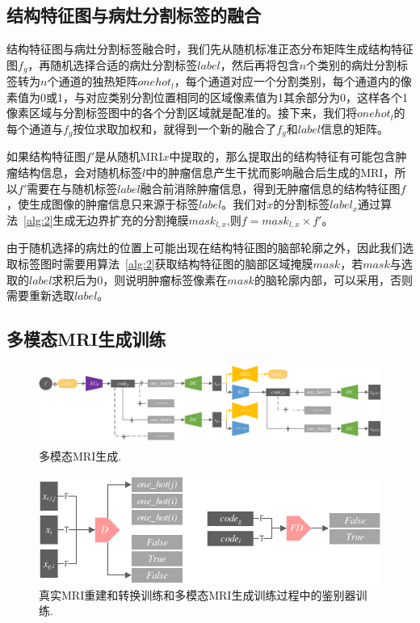 \documentclass[letterpaper]{article} %
\begin{document}
\subsection{结构特征图与病灶分割标签的融合}

结构特征图与病灶分割标签融合时，我们先从随机标准正态分布矩阵生成结构特征图$f_g$，再随机选择合适的病灶分割标签$label$，然后再将包含$n$个类别的病灶分割标签转为$n$个通道的独热矩阵$onehot_l$，每个通道对应一个分割类别，每个通道内的像素值为0或1，与对应类别分割位置相同的区域像素值为1其余部分为0，这样各个1像素区域与分割标签图中的各个分割区域就是配准的。接下来，我们将$onehot_l$的每个通道与$f_g$按位求取加权和，就得到一个新的融合了$f_g$和$label$信息的矩阵。

如果结构特征图$f'$是从随机MRI$x$中提取的，那么提取出的结构特征有可能包含肿瘤结构信息，会对随机标签$l$中的肿瘤信息产生干扰而影响融合后生成的MRI，所以$f'$需要在与随机标签$label$融合前消除肿瘤信息，得到无肿瘤信息的结构特征图$f$，使生成图像的肿瘤信息只来源于标签$label$。我们对$x$的分割标签$label_x$通过算法~\ref{alg:2}生成无边界扩充的分割掩膜$mask_{l,x}$,则$f=mask_{l,x}\times f'$。

由于随机选择的病灶的位置上可能出现在结构特征图的脑部轮廓之外，因此我们选取标签图时需要用算法~\ref{alg:2}获取结构特征图的脑部区域掩膜$mask$，若$mask$与选取的$label$求积后为0，则说明肿瘤标签像素在$mask$的脑轮廓内部，可以采用，否则需要重新选取$label$。

\subsection{多模态MRI生成训练}
\begin{figure}
	\centering
	\includegraphics[width=0.98\columnwidth]{figures/mm_mri_generate}
	\caption{多模态MRI生成.}
	\label{mm_mri_generate}
\end{figure}

\begin{figure}
	\centering
	\includegraphics[width=0.8\columnwidth]{figures/D}
	\caption{真实MRI重建和转换训练和多模态MRI生成训练过程中的鉴别器训练.}
	\label{train_D}
\end{figure}
\end{document}
